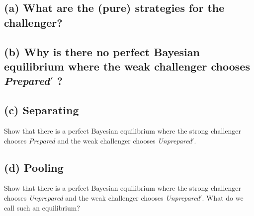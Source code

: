 \documentclass{article}
\begin{document}

\medskip

\subsection{(a) What are the (pure) strategies for the challenger?} 



\subsection{(b) Why is there no perfect Bayesian equilibrium where the weak challenger chooses
\textit{Prepared}$'$ ? }


\subsection{(c) Separating}Show that there is a perfect Bayesian equilibrium where the strong challenger chooses
\textit{Prepared} and the weak challenger chooses \textit{Unprepared}$'$. 


\subsection{(d) Pooling}Show that there is a perfect Bayesian equilibrium where the strong challenger chooses
\textit{Unprepared} and the weak challenger chooses \textit{Unprepared}$'$. What do we call such an
equilibrium? 
\end{document}

